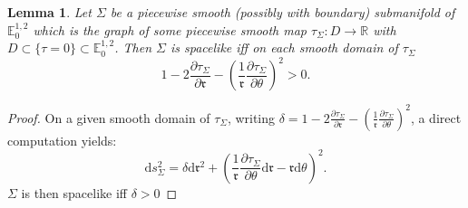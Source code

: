 \documentclass[a4paper,12pt]{article}
\def\r{\mathfrak{r}}
\def\R{\mathbb{R}}
\def\d{\mathrm{d}}
\newcommand{\mass}[1]{{\mathbb E}^{1,2}_{#1}}
\newtheorem{lemou}{Lemma}[section]          %
\begin{document}
    
     \begin{lemou} \label{lem:surface_causal} Let $\Sigma$ be a piecewise smooth (possibly with boundary) submanifold of $\mass{0}$ which is the graph of some piecewise smooth map $\tau_\Sigma: D \rightarrow \R$ with $D\subset \{\tau=0\}\subset \mass{0}$.
     Then $\Sigma$ is spacelike iff on each smooth domain of $\tau_\Sigma$  $$\displaystyle 1-2\frac{\partial \tau_\Sigma}{\partial \r}-\left(\frac{1}{\r}\frac{\partial \tau_\Sigma}{\partial \theta}\right)^2 >0.$$

      \end{lemou}
      \begin{proof}      
            On a given smooth domain of $\tau_\Sigma$, writing   $\delta =1-2\frac{\partial \tau_\Sigma}{\partial \r}-\left(\frac{1}{\r}\frac{\partial \tau_\Sigma}{\partial \theta}\right)^2$,  
            a direct computation yields: 
            $$\d s_\Sigma^2 =\delta \d \r^2 + \left(\frac{1}{\r}\frac{\partial\tau_\Sigma }{\partial \theta}\d \r-\r \d \theta \right)^2.$$
      $\Sigma$ is then spacelike iff $\delta>0$ 




%           
      \end{proof}
\end{document}
